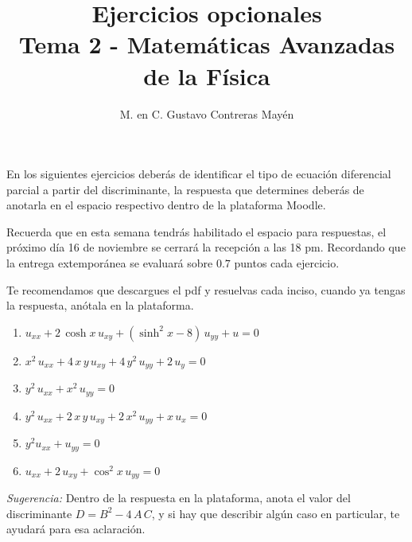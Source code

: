 
\usepackage{apacite}
\title{Ejercicios opcionales \\[0.3em]  \large{Tema 2 - Matemáticas Avanzadas de la Física}\vspace{-3ex}}
\author{M. en C. Gustavo Contreras Mayén}
\date{ }

\vspace{-4cm}
\maketitle
\fontsize{14}{14}\selectfont
En los siguientes ejercicios deberás de identificar el tipo de ecuación diferencial parcial a partir del discriminante, la respuesta que determines deberás de anotarla en el espacio respectivo dentro de la plataforma Moodle.
\par
Recuerda que en esta semana tendrás habilitado el espacio para respuestas, el próximo día 16 de noviembre se cerrará la recepción a las 18 pm. Recordando que la entrega extemporánea se evaluará sobre $\mathbf{0.7}$ puntos cada ejercicio.
\par
Te recomendamos que descargues el pdf y resuelvas cada inciso, cuando ya tengas la respuesta, anótala en la plataforma.
\begin{enumerate}
\item $u_{xx} +  2 \, \cosh x \, u_{xy} + (\sinh^{2} x - 8) \, u_{yy} + u = 0$
\item $x^{2} \, u_{xx} + 4 \, x \, y \, u_{xy} + 4 \, y^{2} \, u_{yy} + 2 \, u_{y} = 0$
\item $y^{2} \, u_{xx} + x^{2} \, u_{yy} = 0$
\item $y^{2} \, u_{xx} + 2 \, x \, y \, u_{xy} + 2 \, x^{2} \, u_{yy} + x \, u_{x} = 0$
\item $y^{2} u_{xx} + u_{yy} = 0$
\item $u_{xx} + 2 \, u_{xy} + \cos^{2} x \, u_{yy} = 0$
\end{enumerate}
\emph{Sugerencia: } Dentro de la respuesta en la plataforma, anota el valor del discriminante $D = B^{2} - 4 \, A \, C$, y si hay que describir algún caso en particular, te ayudará para esa aclaración.
